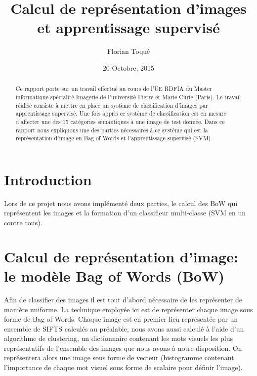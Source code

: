\documentclass[a4paper]{article}
\author{Florian Toqué}
\date{20 Octobre, 2015}
\title{Calcul de représentation d'images et apprentissage supervisé\\}
\begin{document}
\maketitle



\begin{abstract}


Ce rapport porte sur un travail effectué au cours de l'UE RDFIA du Master informatique spécialité Imagerie de l'université Pierre et Marie Curie (Paris). Le travail réalisé consiste à mettre en place un système de classification d’images par apprentissage supervisé. Une fois appris ce système de classification est en mesure d’affecter une des 15 catégories sémantiques à une image de test donnée. Dans ce rapport nous expliquons une des parties nécessaires à ce système qui est la représentation d'image en Bag of Words et l'apprentissage supervisé (SVM). 
\end{abstract}
\newpage
\section{Introduction}
Lors de ce projet nous avons implémenté deux parties, le calcul des BoW qui représentent les images et la formation d'un classifieur multi-classe (SVM en un contre tous).


\section{Calcul de représentation d'image: le modèle Bag of Words (BoW)}
Afin de classifier des images il est tout d'abord nécessaire de les représenter de manière uniforme. La technique employée ici est de représenter chaque image sous forme de Bag of Words. Chaque image est en premier lieu représentée par un ensemble de SIFTS  calculés au préalable, nous avons aussi calculé à l'aide d'un algorithme de clustering, un dictionnaire contenant les mots visuels les plus représentatifs de l'ensemble des images que nous avons à notre disposition. On représentera alors une image sous forme de vecteur (histogramme contenant l'importance de chaque mot visuel sous forme de scalaire pour définir l'image). 
\end{document}
